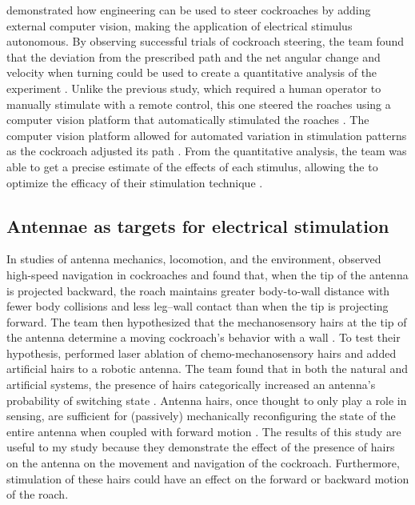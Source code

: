 \citet{whitmire2013kinect} demonstrated how engineering can be used to steer cockroaches by adding external computer vision, making the application of electrical stimulus autonomous. By observing successful trials of cockroach steering, the team found that the deviation from the prescribed path and the net angular change and velocity when turning could be used to create a quantitative analysis of the experiment \citep{whitmire2013kinect}. Unlike the previous study, which required a human operator to manually stimulate with a remote control, this one steered the roaches using a computer vision platform that automatically stimulated the roaches \citep{whitmire2013kinect}. The computer vision platform allowed for automated variation in stimulation patterns as the cockroach adjusted its path \citep{whitmire2013kinect}. From the quantitative analysis, the team was able to get a precise estimate of the effects of each stimulus, allowing the to optimize the efficacy of their stimulation technique \citep{whitmire2013kinect}. 





\subsection{Antennae as targets for electrical stimulation}
In studies of antenna mechanics, locomotion, and the environment, \citet{Mongeau2014} observed high-speed navigation in cockroaches and found that, when the tip of the antenna is projected backward, the roach maintains greater body-to-wall distance with fewer body collisions and less leg–wall contact than when the tip is projecting forward. The team then hypothesized that the mechanosensory hairs at the tip of the antenna determine a moving cockroach's behavior with a wall \citep{Mongeau2014}. To test their hypothesis, \citet{Mongeau2014} performed laser ablation of chemo-mechanosensory hairs and added artificial hairs to a robotic antenna. The team found that in both the natural and artificial systems, the presence of hairs categorically increased an antenna’s probability of switching state \citep{Mongeau2014}. Antenna hairs, once thought to only play a role in sensing, are sufficient for (passively) mechanically reconfiguring the state of the entire antenna when coupled with forward motion \citep{Mongeau2014}. The results of this study are useful to my study because they demonstrate the effect of the presence of hairs on the antenna on the movement and navigation of the cockroach. Furthermore, stimulation of these hairs could have an effect on the forward or backward motion of the roach.

